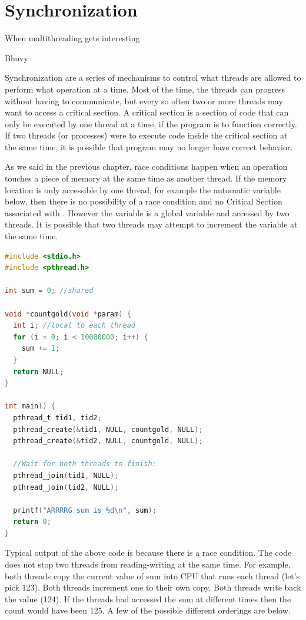 \chapter{Synchronization}

\epigraph{When multithreading gets interesting}{Bhuvy}

Synchronization are a series of mechanisms to control what threads are allowed to perform what operation at a time.
Most of the time, the threads can progress without having to communicate, but every so often two or more threads may want to access a critical section.
A critical section is a section of code that can only be executed by one thread at a time, if the program is to function correctly.
If two threads (or processes) were to execute code inside the critical section at the same time, it is possible that program may no longer have correct behavior.

As we said in the previous chapter, race conditions happen when an operation touches a piece of memory at the same time as another thread.
If the memory location is only accessible by one thread, for example the automatic variable  below, then there is no possibility of a race condition and no Critical Section associated with .
However the  variable is a global variable and accessed by two threads.
It is possible that two threads may attempt to increment the variable at the same time.

\begin{lstlisting}[language=C]
#include <stdio.h>
#include <pthread.h>

int sum = 0; //shared

void *countgold(void *param) {
  int i; //local to each thread
  for (i = 0; i < 10000000; i++) {
    sum += 1;
  }
  return NULL;
}

int main() {
  pthread_t tid1, tid2;
  pthread_create(&tid1, NULL, countgold, NULL);
  pthread_create(&tid2, NULL, countgold, NULL);

  //Wait for both threads to finish:
  pthread_join(tid1, NULL);
  pthread_join(tid2, NULL);

  printf("ARRRRG sum is %d\n", sum);
  return 0;
}
\end{lstlisting}

Typical output of the above code is  because there is a race condition.
The code does not stop two threads from reading-writing  at the same time.
For example, both threads copy the current value of sum into CPU that runs each thread (let's pick 123).
Both threads increment one to their own copy.
Both threads write back the value (124).
If the threads had accessed the sum at different times then the count would have been 125.
A few of the possible different orderings are below.

